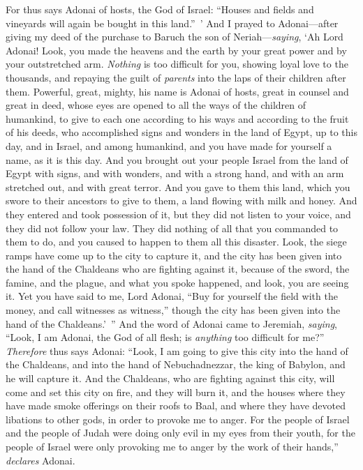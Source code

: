 \begin{biblechapter}
\verse For thus says Adonai of hosts, the God of Israel: “Houses and fields and vineyards will again be bought in this land.” ’
\verse And I prayed to Adonai—after giving my deed of the purchase to Baruch the son of Neriah—\textit{saying},
\verse ‘Ah Lord Adonai! Look, you made the heavens and the earth by your great power and by your outstretched arm. \textit{Nothing} is too difficult for you,
\verse showing loyal love to the thousands, and repaying the guilt of \textit{parents} into the laps of their children after them. Powerful, great, mighty, his name is Adonai of hosts,
\verse great in counsel and great in deed, whose eyes are opened to all the ways of the children of humankind, to give to each one according to his ways and according to the fruit of his deeds,
\verse who accomplished signs and wonders in the land of Egypt, up to this day, and in Israel, and among humankind, and you have made for yourself a name, as it is this day.
\verse And you brought out your people Israel from the land of Egypt with signs, and with wonders, and with a strong hand, and with an arm stretched out, and with great terror.
\verse And you gave to them this land, which you swore to their ancestors to give to them, a land flowing with milk and honey.
\verse And they entered and took possession of it, but they did not listen to your voice, and they did not follow your law. They did nothing of all that you commanded to them to do, and you caused to happen to them all this disaster.
\verse Look, the siege ramps have come up to the city to capture it, and the city has been given into the hand of the Chaldeans who are fighting against it, because of the sword, the famine, and the plague, and what you spoke happened, and look, you are seeing it.
\verse Yet you have said to me, Lord Adonai, “Buy for yourself the field with the money, and call witnesses as witness,” though the city has been given into the hand of the Chaldeans.’ ”
\verse And the word of Adonai came to Jeremiah, \textit{saying},
\verse “Look, I am Adonai, the God of all flesh; is \textit{anything} too difficult for me?”
\verse \textit{Therefore} thus says Adonai: “Look, I am going to give this city into the hand of the Chaldeans, and into the hand of Nebuchadnezzar, the king of Babylon, and he will capture it.
\verse And the Chaldeans, who are fighting against this city, will come and set this city on fire, and they will burn it, and the houses where they have made smoke offerings on their roofs to Baal, and where they have devoted libations to other gods, in order to provoke me to anger.
\verse For the people of Israel and the people of Judah were doing only evil in my eyes from their youth, for the people of Israel were only provoking me to anger by the work of their hands,” \textit{declares} Adonai.

\end{biblechapter}
